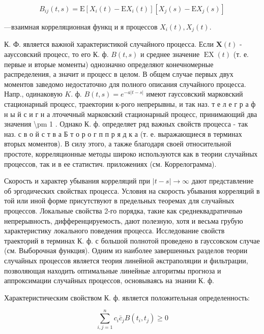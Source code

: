 \documentclass[10pt]{article}
\begin{document}
\[

B_{i j}(t, s)=\mathrm{E}\left[X_{i}(t)-\mathrm{E} X_{i}(t)\right]\left[X_{j}(s)-\mathrm{E} X_{j}(s)\right]

\]



—взаимная корреляционная функц и я процессов $X_{i}(t), X_{j}(t)$.



К. Ф. является важной характеристикой случайного процесса. Если $\boldsymbol{X}(t)$ - аауссовский процесс, то его К. ф. $B(t, s)$ и среднее значение $\operatorname{EX}(t)$ (т. е. первые и вторые моменты) однозначно определяют конечномерные распределения, а значит и процесс в целом. В общем случае первых двух моментов заведомо недостаточно для полного описания случайного процесса. Напр., одинаковую $K$. ф. $B(t, s)=e^{-a|t-s|}$ имеют гауссовский марковский стационарный процесс, траектории к-рого непрерывны, и так наз. т е л е г р а ф н ы й с и г н а лточечный марковский стационарный процесс, принимающий два значения \textbackslash pm 1 . Однако К. ф. определяет ряд важных свойств процесса - так наз. с в о й с т в а Б т о р о г п п р я д к а (т. е. выражающиеся в терминах вторых моментов). В силу этого, а также благодаря своей относительной простоте, корреляционные методы широко используются как в теории случайных процессов, так и в ее статистич. приложениях (см. Коррелограмма).



Скорость и характер убывания корреляций при $|t-s| \rightarrow \infty$ дают представление об эргодических свойствах процесса. Условия на скорость убывания корреляций в той или иной форме присутствуют в предельных теоремах для случайных процессов. Локальные свойства 2-го порядка, такие как среднеквадратичныө непрерывность, дифференцируемость, дают полезную, хотя и весьма грубую характеристику локального поведения процесса. Исследование свойств траекторий в терминах К. ф. с большой полнотой проведено в гауссовском случае (см. Выборочная функция). Одним из наиболее завершенных разделов теории случайных процессов является теория линейной әкстраполяции и фильтрации, позволяющая находить оптимальные линейные алгоритмы прогноза и аппроксимации случайных процессов, основываясь на знании К. ф.



Характеристическим свойством К. ф. является положительная определенность:



\[

\sum_{i, j=1}^{n} c_{i} \bar{c}_{j} B\left(t_{i}, t_{j}\right) \geqslant 0

\]
\end{document}
